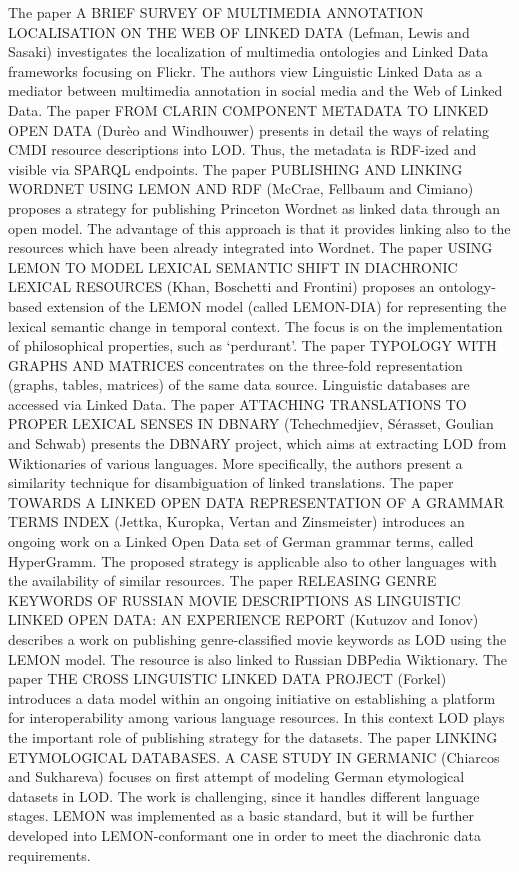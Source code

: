 \documentclass{article}
\begin{document}
The paper A BRIEF SURVEY OF MULTIMEDIA ANNOTATION LOCALISATION ON THE WEB OF LINKED 
DATA (Lefman, Lewis and Sasaki) investigates the localization of multimedia ontologies 
and Linked Data frameworks focusing on Flickr. The authors view Linguistic Linked 
Data as a mediator between multimedia annotation in social media and the Web of 
Linked Data. The paper FROM CLARIN COMPONENT METADATA TO LINKED OPEN DATA (Durèo 
and Windhouwer) presents in detail the ways of relating CMDI resource descriptions 
into LOD. Thus, the metadata is RDF-ized and visible via SPARQL endpoints. The 
paper PUBLISHING AND LINKING WORDNET USING LEMON AND RDF (McCrae, Fellbaum and 
Cimiano) proposes a strategy for publishing Princeton Wordnet as linked data through 
an open model. The advantage of this approach is that it provides linking also 
to the resources which have been already integrated into Wordnet. The paper USING 
LEMON TO MODEL LEXICAL SEMANTIC SHIFT IN DIACHRONIC LEXICAL RESOURCES (Khan, Boschetti 
and Frontini) proposes an ontology-based extension of the LEMON model (called LEMON-DIA) 
for representing the lexical semantic change in temporal context. The focus is 
on the implementation of philosophical properties, such as `perdurant'. The paper 
TYPOLOGY WITH GRAPHS AND MATRICES concentrates on the three-fold representation 
(graphs, tables, matrices) of the same data source. Linguistic databases are accessed 
via Linked Data. The paper ATTACHING TRANSLATIONS TO PROPER LEXICAL SENSES IN DBNARY 
(Tchechmedjiev, Sérasset, Goulian and Schwab) presents the DBNARY project, which 
aims at extracting LOD from Wiktionaries of various languages. More specifically, 
the authors present a similarity technique for disambiguation of linked translations. 
The paper TOWARDS A LINKED OPEN DATA REPRESENTATION OF A GRAMMAR TERMS INDEX (Jettka, 
Kuropka, Vertan and Zinsmeister) introduces an ongoing work on a Linked Open Data 
set of German grammar terms, called HyperGramm. The proposed strategy is applicable 
also to other languages with the availability of similar resources. The paper RELEASING 
GENRE KEYWORDS OF RUSSIAN MOVIE DESCRIPTIONS AS LINGUISTIC LINKED OPEN DATA: AN 
EXPERIENCE REPORT (Kutuzov and Ionov) describes a work on publishing genre-classified 
movie keywords as LOD using the LEMON model. The resource is also linked to Russian 
DBPedia Wiktionary. The paper THE CROSS LINGUISTIC LINKED DATA PROJECT (Forkel) 
introduces a data model within an ongoing initiative on establishing a platform 
for interoperability among various language resources. In this context LOD plays 
the important role of publishing strategy for the datasets. The paper LINKING ETYMOLOGICAL 
DATABASES. A CASE STUDY IN GERMANIC (Chiarcos and Sukhareva) focuses on first attempt 
of modeling German etymological datasets in LOD. The work is challenging, since 
it handles different language stages. LEMON was implemented as a basic standard, 
but it will be further developed into LEMON-conformant one in order to meet the 
diachronic data requirements.

\newpage
\end{document}
